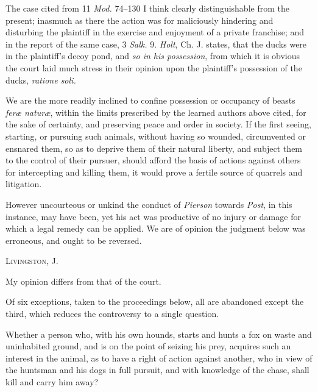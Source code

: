The case cited from 11 \textit{Mod.}
74--130
I think clearly distinguishable from the present; inasmuch as there the action
was for maliciously hindering and disturbing the plaintiff in the exercise and
enjoyment of a private franchise; and in the report of the same case, 3
\textit{Salk.} 9. \textit{Holt}, Ch. J. states, that the ducks were in the
plaintiff's decoy pond, and \textit{so in his possession}, from which it is
obvious the court laid much stress in their opinion upon the plaintiff's
possession of the ducks, \textit{ratione soli.}

We are the more readily inclined to confine possession or occupancy of beasts
\textit{fer{\ae} natur{\ae}}, within the limits prescribed by the learned
authors above cited, for the sake of certainty, and preserving peace and order
in society. If the first seeing, starting, or pursuing such animals, without
having so wounded, circumvented or ensnared them, so as to deprive them of their
natural liberty, and subject them to the control of their pursuer, should afford
the basis of actions against others for intercepting and killing them, it would
prove a fertile source of quarrels and litigation.

However uncourteous or unkind the conduct of \textit{Pierson} towards
\textit{Post}, in this instance, may have been, yet his act was productive of no
injury or damage for which a legal remedy can be applied. We are of opinion the
judgment below was erroneous, and ought to be reversed.

\opinion \textsc{Livingston}, J. 

My opinion differs from that of the court.

Of six exceptions, taken to the proceedings below, all are abandoned except the
third, which reduces the controversy to a single question.

Whether a person who, with his own hounds, starts and hunts a fox on waste and
uninhabited ground, and is on the point of seizing his prey, acquires such an
interest in the animal, as to have a right of action against another, who in
view of the huntsman and his dogs in full pursuit, and with knowledge of the
chase, shall kill and carry him away?


